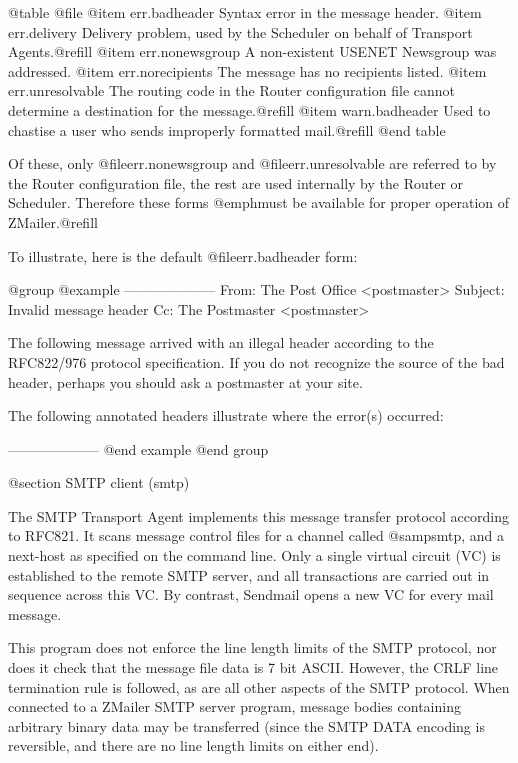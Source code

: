 {{@table @file
@item err.badheader
Syntax error in the message header.
@item err.delivery
Delivery problem, used by the Scheduler on behalf of Transport Agents.@refill
@item err.nonewsgroup
A non-existent USENET Newsgroup was addressed.
@item err.norecipients
The message has no recipients listed.
@item err.unresolvable
The routing code in the Router configuration file cannot determine a
destination for the message.@refill
@item warn.badheader
Used to chastise a user who sends improperly formatted mail.@refill
@end table

Of these, only @file{err.nonewsgroup} and @file{err.unresolvable} are
referred to by the Router configuration file, the rest are used internally by
the Router or Scheduler.  Therefore these forms @emph{must} be available for
proper operation of ZMailer.@refill

To illustrate, here is the default @file{err.badheader} form:

@group
@example
--------------------
From:   The Post Office <postmaster>
Subject: Invalid message header
Cc:     The Postmaster <postmaster>

The following message arrived with an illegal header according to the
RFC822/976 protocol specification. If you do not recognize the source
of the bad header, perhaps you should ask a postmaster at your site.

The following annotated headers illustrate where the error(s) occurred:

--------------------
@end example
@end group

@section SMTP client (smtp)

The SMTP Transport Agent implements this message transfer protocol
according to RFC821.  It scans message control files for a channel called
@samp{smtp}, and a next-host as specified on the command line.  Only a single
virtual circuit (VC) is established to the remote SMTP server, and all
transactions are carried out in sequence across this VC.  By contrast,
Sendmail opens a new VC for every mail message.

This program does not enforce the line length limits of the SMTP protocol,
nor does it check that the message file data is 7 bit ASCII.  However, the
CRLF line termination rule is followed, as are all other aspects of the SMTP
protocol.  When connected to a ZMailer SMTP server program, message bodies
containing arbitrary binary data may be transferred (since the SMTP DATA
encoding is reversible, and there are no line length limits on either end).

}}
